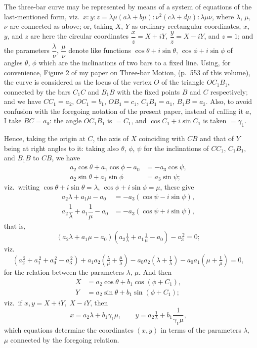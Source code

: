 \documentclass[11pt]{article}
\begin{document}
The three-bar curve may be represented by means of a system of equations of the last-mentioned form, viz.\ $x : y : z = \lambda\mu(a\lambda + b\mu) : \nu^2(c\lambda + d\mu) : \lambda\mu\nu$, where $\lambda$, $\mu$, $\nu$ are connected as above; or, taking $X$, $Y$ as ordinary rectangular coordinates, $x$, $y$, and $z$ are here the circular coordinates $\dfrac{x}{z} = X + iY$, $\dfrac{y}{z} = X - iY$, and $z = 1$; and the parameters $\dfrac{\lambda}{\nu}$, $\dfrac{\mu}{\nu}$ denote like functions $\cos\theta + i\sin\theta$, $\cos\phi + i\sin\phi$ of angles $\theta$, $\phi$ which are the inclinations of two bars to a fixed line. Using, for convenience, Figure 2 of my paper on Three-bar Motion, (p.~553 of this volume), the curve is considered as the locus of the vertex $O$ of the triangle $OC_1B_1$, connected by the bars $C_1C$ and $B_1B$ with the fixed points $B$ and $C$ respectively; and we have $CC_1 = a_2$, $OC_1 = b_1$, $OB_1 = c_1$, $C_1B_1 = a_1$, $B_1B = a_3$. Also, to avoid confusion with the foregoing notation of the present paper, instead of calling it $a$, I take $BC = a_0$: the angle $OC_1B_1$ is $= C_1$, and $\cos C_1 + i\sin C_1$ is taken $= \gamma_1$.

Hence, taking the origin at $C$, the axis of $X$ coinciding with $CB$ and that of $Y$ being at right angles to it: taking also $\theta$, $\phi$, $\psi$ for the inclinations of $CC_1$, $C_1B_1$, and $B_1B$ to $CB$, we have
\begin{align*}
a_2 \cos\theta + a_1 \cos\phi - a_0 &= -a_3\cos\psi,\\
a_2 \sin\theta + a_1 \sin\phi &= a_3\sin\psi;
\end{align*}
viz.\ writing $\cos\theta + i\sin\theta = \lambda$, $\cos\phi + i\sin\phi = \mu$, these give
\begin{align*}
a_2\lambda + a_1\mu - a_0 &= -a_3(\cos\psi - i\sin\psi),\\
a_2\dfrac{1}{\lambda} + a_1\dfrac{1}{\mu} - a_0 &= -a_3(\cos\psi + i\sin\psi),
\end{align*}
that is,
\[
(a_2\lambda + a_1\mu - a_0)\!\left(a_2\tfrac{1}{\lambda} + a_1\tfrac{1}{\mu} - a_0\right) - a_3^{\,2} = 0;
\]
viz.\
\[
(a_2^{\,2} + a_1^{\,2} + a_0^{\,2} - a_3^{\,2}) + a_1 a_2\!\left(\tfrac{\lambda}{\mu} + \tfrac{\mu}{\lambda}\right) - a_0 a_2\!\left(\lambda + \tfrac{1}{\lambda}\right) - a_0 a_1\!\left(\mu + \tfrac{1}{\mu}\right) = 0,
\]
for the relation between the parameters $\lambda$, $\mu$. And then
\begin{align*}
X &= a_2\cos\theta + b_1\cos(\phi + C_1),\\
Y &= a_2\sin\theta + b_1\sin(\phi + C_1);
\end{align*}
viz.\ if $x, y = X + iY,\; X - iY$, then
\[
x = a_2\lambda + b_1\gamma_1\mu,\qquad y = a_2\tfrac{1}{\lambda} + b_1\dfrac{1}{\gamma_1\mu},
\]
which equations determine the coordinates $(x, y)$ in terms of the parameters $\lambda$, $\mu$ connected by the foregoing relation.
\end{document}
